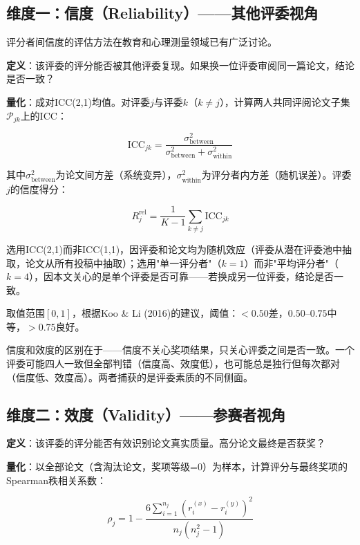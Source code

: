 \documentclass[UTF8,12pt]{ctexart}
\begin{document}
\subsection{维度一：信度（Reliability）——其他评委视角}

评分者间信度的评估方法在教育和心理测量领域已有广泛讨论\cite{stemler2004,bajpai2015,sollerman2025,goertzen2020}。

\textbf{定义}：该评委的评分能否被其他评委复现。如果换一位评委审阅同一篇论文，结论是否一致？

\textbf{量化}：成对ICC(2,1)均值。对评委$j$与评委$k$（$k \neq j$），计算两人共同评阅论文子集$\mathcal{P}_{jk}$上的ICC：

\begin{equation}
\text{ICC}_{jk} = \frac{\sigma^2_{\text{between}}}{\sigma^2_{\text{between}} + \sigma^2_{\text{within}}}
\end{equation}

其中$\sigma^2_{\text{between}}$为论文间方差（系统变异），$\sigma^2_{\text{within}}$为评分者内方差（随机误差）。评委$j$的信度得分：

\begin{equation}
R_j^{\text{rel}} = \frac{1}{K-1}\sum_{k \neq j}\text{ICC}_{jk}
\end{equation}

选用ICC(2,1)而非ICC(1,1)，因评委和论文均为随机效应（评委从潜在评委池中抽取，论文从所有投稿中抽取）；选用"单一评分者"（$k=1$）而非"平均评分者"（$k=4$），因本文关心的是单个评委是否可靠——若换成另一位评委，结论是否一致。

取值范围$[0,1]$，根据Koo \& Li (2016)\cite{koo2016}的建议，阈值：$<0.50$差，$0.50$--$0.75$中等，$>0.75$良好。

信度和效度的区别在于——信度不关心奖项结果，只关心评委之间是否一致。一个评委可能四人一致但全部判错（信度高、效度低），也可能总是独行但每次都对（信度低、效度高）。两者捕获的是评委素质的不同侧面。

\subsection{维度二：效度（Validity）——参赛者视角}

\textbf{定义}：该评委的评分能否有效识别论文真实质量。高分论文最终是否获奖？

\textbf{量化}：以全部论文（含淘汰论文，奖项等级=0）为样本，计算评分与最终奖项的Spearman秩相关系数：

\begin{equation}
\rho_j = 1 - \frac{6 \sum_{i=1}^{n_j} (r_i^{(x)} - r_i^{(y)})^2}{n_j(n_j^2 - 1)}
\end{equation}
\end{document}
